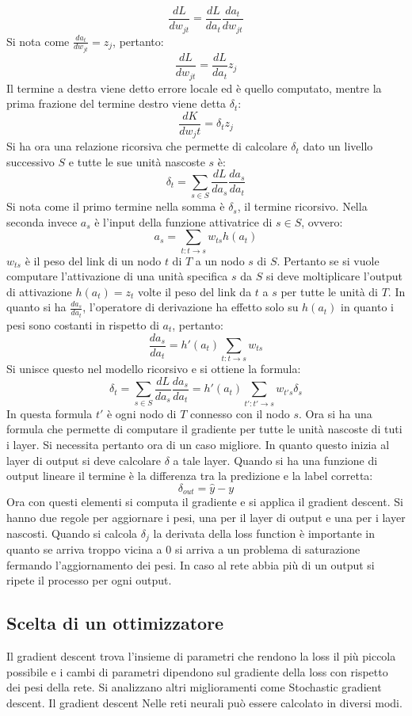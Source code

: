	$$\frac{dL}{dw_{jt}} = \frac{dL}{da_t}\frac{da_t}{dw_{jt}}$$
	Si nota come $\frac{da_t}{dw_{jt}} = z_j$, pertanto:
	$$\frac{dL}{dw_{jt}} = \frac{dL}{da_t}z_j$$
	Il termine a destra viene detto errore locale ed \`e quello computato, mentre la prima frazione del termine destro viene detta $\delta_t$:
	$$\frac{dK}{dw_jt} = \delta_tz_j$$
	Si ha ora una relazione ricorsiva che permette di calcolare $\delta_t$ dato un livello successivo $S$ e tutte le sue unit\`a nascoste $s$ \`e:
	$$\delta_t = \sum\limits_{s\in S} \frac{dL}{da_s}\frac{da_s}{da_t}$$
	Si nota come il primo termine nella somma \`e $\delta_s$, il termine ricorsivo.
	Nella seconda invece $a_s$ \`e l'input della funzione attivatrice di $s\in S$, ovvero:
	$$a_s = \sum\limits_{t:t\rightarrow s}w_{ts}h(a_t)$$
	$w_{ts}$ \`e il peso del link di un nodo $t$ di $T$ a un nodo $s$ di $S$.
	Pertanto se si vuole computare l'attivazione di una unit\`a specifica $s$ da $S$ si deve moltiplicare l'output di attivazione $h(a_t) = z_t$ volte il peso del link da $t$ a $s$ per tutte le unit\`a di $T$.
	In quanto si ha $\frac{d a_s}{da_t}$, l'operatore di derivazione ha effetto solo su $h(a_t)$ in quanto i pesi sono costanti in rispetto di $a_t$, pertanto:
	$$\frac{da_s}{da_t} = h'(a_t)\sum\limits_{t:t\rightarrow s}w_{ts}$$
	Si unisce questo nel modello ricorsivo e si ottiene la formula:
	$$\delta_t = \sum\limits_{s\in S} \frac{dL}{da_s}\frac{da_s}{da_t} = h'(a_t)\sum\limits_{t':t'\rightarrow s}w_{t's}\delta_s$$
	In questa formula $t'$ \`e ogni nodo di $T$ connesso con il nodo $s$.
	Ora si ha una formula che permette di computare il gradiente per tutte le unit\`a nascoste di tuti i layer.
	Si necessita pertanto ora di un caso migliore.
	In quanto questo inizia al layer di output si deve calcolare $\delta$ a tale layer.
	Quando si ha una funzione di output lineare il termine \`e la differenza tra la predizione e la label corretta:
	$$\delta_{out} = \hat{y}- y$$
	Ora con questi elementi si computa il gradiente e si applica il gradient descent.
	Si hanno due regole per aggiornare i pesi, una per il layer di output e una per i layer nascosti.
	Quando si calcola $\delta_j$ la derivata della loss function \`e importante in quanto se arriva troppo vicina a $0$ si arriva a un problema di saturazione fermando l'aggiornamento dei pesi.
	In caso al rete abbia pi\`u di un output si ripete il processo per ogni output.

	\subsection{Scelta di un ottimizzatore}
	Il gradient descent trova l'insieme di parametri che rendono la loss il pi\`u piccola possibile e i cambi di parametri dipendono sul gradiente della loss con rispetto dei pesi della rete.
	Si analizzano altri miglioramenti come Stochastic gradient descent.
	Il gradient descent Nelle reti neurali pu\`o essere calcolato in diversi modi.

